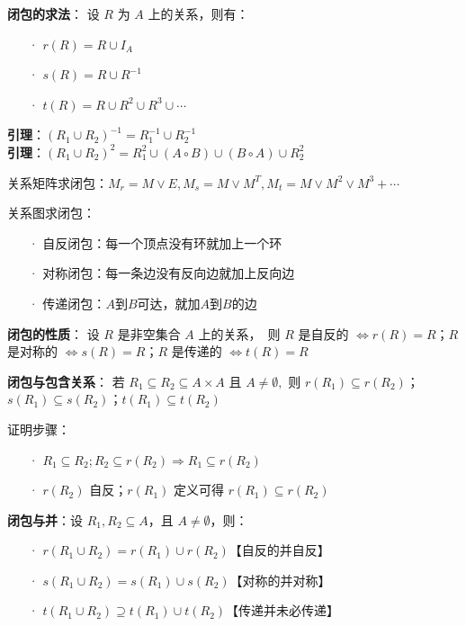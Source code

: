 	\textbf{闭包的求法}：
	设 $R$ 为 $A$ 上的关系，则有：
	\begin{itemize}
		\item[·] $r(R) = R \cup I_A$
		\item[·] $s(R) = R \cup R^{-1}$
		\item[·] $t(R) = R \cup R^2 \cup R^3 \cup \cdots$
	\end{itemize}
	
	\textbf{引理}：$(R_1 \cup R_2)^{-1} = R_1^{-1} \cup R_2^{-1}$\\	
	\textbf{引理}：$(R_1 \cup R_2)^{2} = R_1^{2} \cup (A \circ B) \cup (B \circ A) \cup R_2^{2}$
	
	关系矩阵求闭包：$M_r = M \lor E, M_s = M \lor M^T, M_t = M \lor M^2 \lor M^3 + \cdots$
	
	关系图求闭包：
	\begin{itemize}
		\item[·] 自反闭包：每一个顶点没有环就加上一个环
		\item[·] 对称闭包：每一条边没有反向边就加上反向边
		\item[·] 传递闭包：$A$到$B$可达，就加$A$到$B$的边
	\end{itemize}
	
	\textbf{闭包的性质}：
	设 $R$ 是非空集合 $A$ 上的关系，~则 $R$ 是自反的 $\Leftrightarrow r(R) = R$；$R$ 是对称的 $\Leftrightarrow s(R) = R$；$R$ 是传递的 $\Leftrightarrow t(R) = R$
	
	\textbf{闭包与包含关系}：
	$\text{若 } R_1 \subseteq R_2 \subseteq A \times A \text{ 且 } A \neq \emptyset, \text{ 则}$
	$r(R_1) \subseteq r(R_2)$；$s(R_1) \subseteq s(R_2)$；$t(R_1) \subseteq t(R_2)$
	
	证明步骤：
	\begin{enumerate}
		\item[·] $R_1 \subseteq R_2; R_2 \subseteq r(R_2) \Rightarrow R_1 \subseteq r(R_2)$
		\item[·] $r(R_2)$ 自反；$r(R_1)$ 定义可得 $r(R_1) \subseteq r(R_2)$
	\end{enumerate}
	
	\textbf{闭包与并}：设 $R_1, R_2 \subseteq A$，且 $A \neq \emptyset$，则：
	\begin{itemize}
		\item[·] $r(R_1 \cup R_2) = r(R_1) \cup r(R_2)$【自反的并自反】
		\item[·] $s(R_1 \cup R_2) = s(R_1) \cup s(R_2)$【对称的并对称】
		\item[·] $t(R_1 \cup R_2) \supseteq t(R_1) \cup t(R_2)$【传递并未必传递】
	\end{itemize}
	
